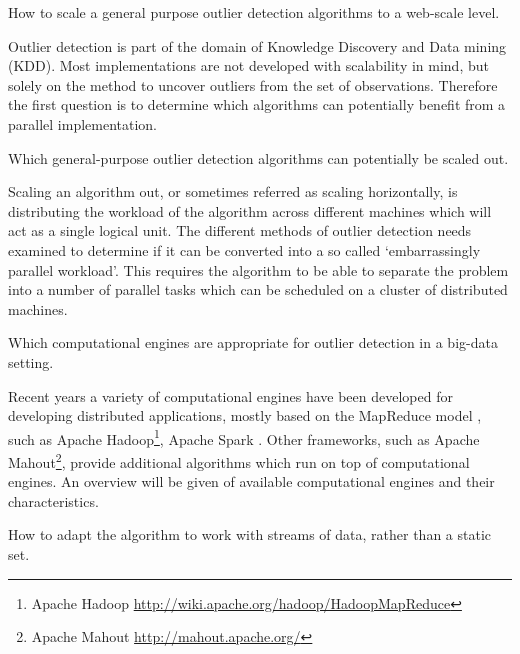 \begin{research-question} 
How to scale a general purpose outlier detection algorithms to a web-scale level. \label{req1}
\end{research-question}   

Outlier detection is part of the domain of Knowledge Discovery and Data mining (KDD). Most implementations are not developed with scalability in mind, but solely on the method to uncover outliers from the set of observations. Therefore the first question is to determine which algorithms can potentially benefit from a parallel implementation.

\begin{research-sub-question} 
Which general-purpose outlier detection algorithms can potentially be scaled out. \label{sub-req1}
\end{research-sub-question}

Scaling an algorithm out, or sometimes referred as scaling horizontally, is distributing the workload of the algorithm across different machines which will act as a single logical unit. The different methods of outlier detection needs examined to determine if it can be converted into a so called `embarrassingly parallel workload'. This requires the algorithm to be able to separate the problem into a number of parallel tasks which can be scheduled on a cluster of distributed machines.

\begin{research-sub-question} 
Which computational engines are appropriate for outlier detection in a big-data setting. \label{sub-req2}
\end{research-sub-question}

Recent years a variety of computational engines have been developed for developing distributed applications, mostly based on the MapReduce model \cite{Dean:2008:MSD:1327452.1327492}, such as Apache Hadoop\footnote{Apache Hadoop \url{http://wiki.apache.org/hadoop/HadoopMapReduce}}, Apache Spark \cite{Zaharia:2010:SCC:1863103.1863113}. Other frameworks, such as Apache Mahout\footnote{Apache Mahout \url{http://mahout.apache.org/}}, provide additional algorithms which run on top of computational engines. An overview will be given of available computational engines and their characteristics.


\begin{research-sub-question} 
How to adapt the algorithm to work with streams of data, rather than a static set. \label{sub-req3}
\end{research-sub-question}

